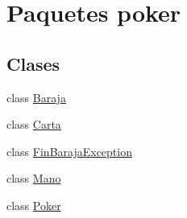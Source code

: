 \hypertarget{namespacepoker}{}\section{Paquetes poker}
\label{namespacepoker}
\subsection*{Clases}
\begin{DoxyCompactItemize}
\item 
class \mbox{\hyperlink{classpoker_1_1Baraja}{Baraja}}
\item 
class \mbox{\hyperlink{classpoker_1_1Carta}{Carta}}
\item 
class \mbox{\hyperlink{classpoker_1_1FinBarajaException}{Fin\+Baraja\+Exception}}
\item 
class \mbox{\hyperlink{classpoker_1_1Mano}{Mano}}
\item 
class \mbox{\hyperlink{classpoker_1_1Poker}{Poker}}
\end{DoxyCompactItemize}
